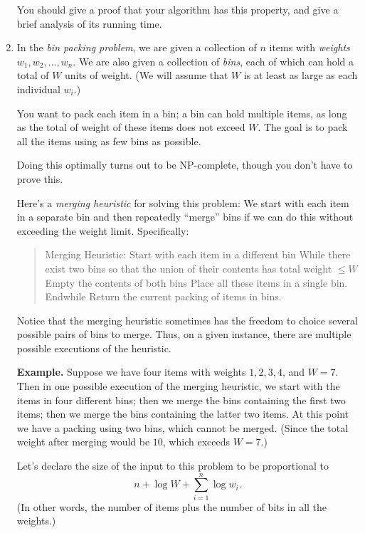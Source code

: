 \documentclass[12pt]{article}
\begin{document}
\begin{enumerate}
You should give a proof that your algorithm has this property,
and give a brief analysis of its running time.



\item

In the {\em bin packing problem},
we are given a collection of $n$ items with
{\em weights} $w_1, w_2, \ldots, w_n$.
We are also given a collection of {\em bins},
each of which can hold a total of $W$ units of weight.
(We will assume that $W$ is at least as large as each individual $w_i$.)

You want to pack each item in a bin;
a bin can hold multiple items, as long
as the total of weight of these items does not exceed $W$.
The goal is to pack all the items using as few bins as possible.

Doing this optimally turns out to be NP-complete, though
you don't have to prove this.

\bigskip
Here's a {\em merging heuristic} for solving this problem:
We start with each item in a separate bin and then repeatedly
``merge'' bins if we can do this without exceeding the weight limit.
Specifically:
\begin{quote}
\begin{code}
Merging Heuristic:
  Start with each item in a different bin
  While there exist two bins so that the union of
        their contents has total weight $\leq W$
     Empty the contents of both bins
     Place all these items in a single bin.
  Endwhile
  Return the current packing of items in bins.
\end{code}
\end{quote}
Notice that the merging heuristic sometimes has
the freedom to choice several possible pairs of bins to merge.
Thus, on a given instance, there are multiple possible
executions of the heuristic.

\bigskip
{\bf Example.} Suppose we have four items with weights
$1, 2, 3, 4$, and $W = 7$.
Then in one possible execution of the merging heuristic, we
start with the items in four different bins;
then we merge the bins containing the first two items;
then we merge the bins containing the latter two items.
At this point we have a packing using two bins,
which cannot be merged.
(Since the total weight after merging would be $10$,
which exceeds $W = 7$.)

\bigskip
{}
Let's declare the size of the
input to this problem to be proportional to
$$n + \log W + \sum_{i=1}^n \log w_i.$$
(In other words, the number of items plus
the number of bits in all the weights.)


\end{enumerate}
\end{document}
